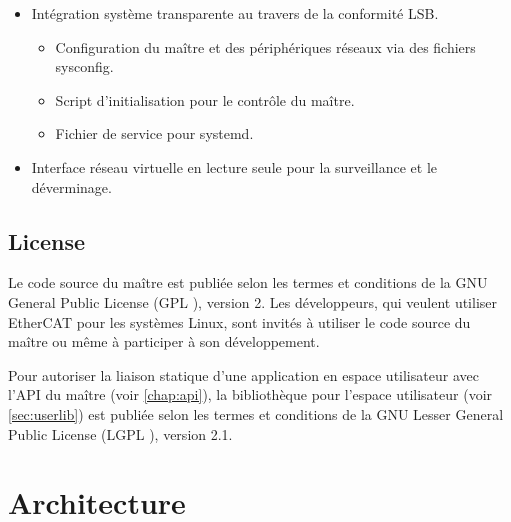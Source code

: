 \documentclass[a4paper,12pt,BCOR6mm,bibtotoc,idxtotoc]{scrbook}
\begin{document}
\begin{itemize}
\begin{itemize}
  \end{itemize}

\item Int\'egration syst\`eme transparente au travers de la
  conformit\'e LSB.

  \begin{itemize}

  \item Configuration du ma\^itre et des p\'eriph\'eriques r\'eseaux
    via des fichiers sysconfig.

  \item Script d'initialisation pour le contr\^ole du ma\^itre.

  \item Fichier de service pour systemd.

  \end{itemize}

\item Interface r\'eseau virtuelle en lecture seule pour la surveillance et le d\'everminage.

\end{itemize}


\section{License}
\label{sec:license}

Le code source du ma\^itre est publi\'ee selon les termes et
conditions de la GNU General Public License (GPL
\cite{gpl}), version 2. Les d\'eveloppeurs, qui veulent
utiliser EtherCAT pour les syst\`emes Linux, sont invit\'es \`a
utiliser le code source du ma\^itre ou m\^eme \`a participer \`a son
d\'eveloppement.

Pour autoriser la liaison statique d'une application en espace
utilisateur avec l'API du ma\^itre (voir \autoref{chap:api}), la
biblioth\`eque pour l'espace utilisateur (voir \autoref{sec:userlib})
est publi\'ee selon les termes et conditions de la GNU Lesser General
Public License (LGPL \cite{lgpl}), version 2.1.


\chapter{Architecture}
\label{chap:arch}
\end{document}
